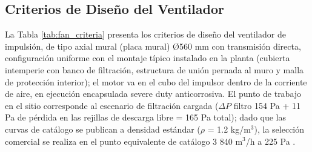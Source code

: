 \subsection{Criterios de Diseño del Ventilador}

La Tabla \ref{tab:fan_criteria} presenta los criterios de diseño del ventilador de impulsión, de tipo axial mural (placa mural) Ø560 mm con transmisión directa, configuración uniforme con el montaje típico instalado en la planta (cubierta intemperie con banco de filtración, estructura de unión pernada al muro y malla de protección interior); el motor va en el cubo del impulsor dentro de la corriente de aire, en ejecución encapsulada severe duty anticorrosiva. El punto de trabajo en el sitio corresponde al escenario de filtración cargada ($\Delta P$ filtro 154 Pa + 11 Pa de pérdida en las rejillas de descarga libre = 165 Pa total); dado que las curvas de catálogo se publican a densidad estándar ($\rho$ = 1.2 kg/m$^3$), la selección comercial se realiza en el punto equivalente de catálogo 3 840 m$^3$/h a 225 Pa \cite{dml_informe_investigacion_2026,dml_hd_vent_001}.


